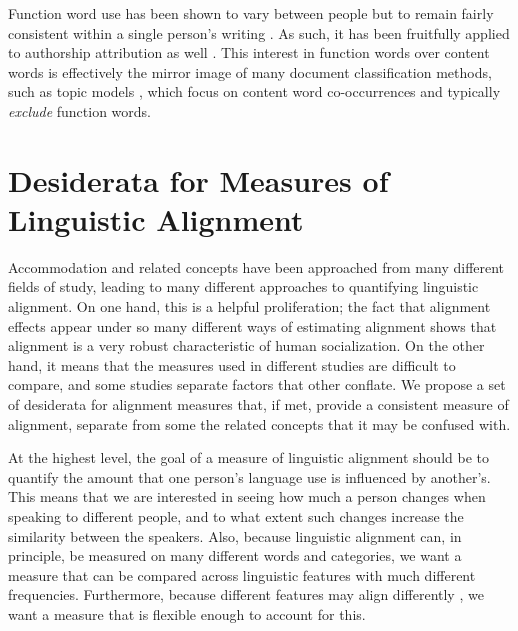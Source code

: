 \documentclass{acm_proc_article-sp}
\begin{document}
Function word use has been shown to vary between people but to remain fairly consistent within a single person's writing \cite{PennebakerKing1999}. As such, it has been fruitfully applied to authorship attribution as well \cite{?}. This interest in function words over content words is effectively the mirror image of many document classification methods, such as topic models \cite{BleiNgJordan2003}, which focus on content word co-occurrences and typically \emph{exclude} function words.




\section{Desiderata for Measures of Linguistic Alignment }

Accommodation and related concepts have been approached from many different fields of study, leading to many different approaches to quantifying linguistic alignment. On one hand, this is a helpful proliferation; the fact that alignment effects appear under so many different ways of estimating alignment shows that alignment is a very robust characteristic of human socialization.  On the other hand, it means that the measures used in different studies are difficult to compare, and some studies separate factors that other conflate. We propose a set of desiderata for alignment measures that, if met, provide a consistent measure of alignment, separate from some the related concepts that it may be confused with.

At the highest level, the goal of a measure of linguistic alignment should be to quantify the amount that one person's language use is influenced by another's. This means that we are interested in seeing how much a person changes when speaking to different people, and to what extent such changes increase the similarity between the speakers. Also, because linguistic alignment can, in principle, be measured on many different words and categories, we want a measure that can be compared across linguistic features with much different frequencies.  Furthermore, because different features may align differently \cite{BilousKrauss1988,Ferrara1991}, we want a measure that is flexible enough to account for this.
\end{document}
